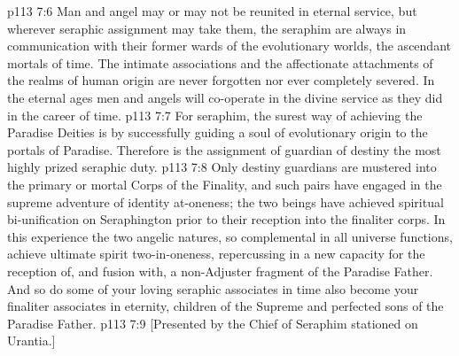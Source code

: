 \vs p113 7:6 Man and angel may or may not be reunited in eternal service, but wherever seraphic assignment may take them, the seraphim are always in communication with their former wards of the evolutionary worlds, the ascendant mortals of time. The intimate associations and the affectionate attachments of the realms of human origin are never forgotten nor ever completely severed. In the eternal ages men and angels will co\hyp{}operate in the divine service as they did in the career of time.
\pc \vs p113 7:7 For seraphim, the surest way of achieving the Paradise Deities is by successfully guiding a soul of evolutionary origin to the portals of Paradise. Therefore is the assignment of guardian of destiny the most highly prized seraphic duty.
\vs p113 7:8 Only destiny guardians are mustered into the primary or mortal Corps of the Finality, and such pairs have engaged in the supreme adventure of identity at\hyp{}oneness; the two beings have achieved spiritual bi\hyp{}unification on Seraphington prior to their reception into the finaliter corps. In this experience the two angelic natures, so complemental in all universe functions, achieve ultimate spirit two\hyp{}in\hyp{}oneness, repercussing in a new capacity for the reception of, and fusion with, a non\hyp{}Adjuster fragment of the Paradise Father. And so do some of your loving seraphic associates in time also become your finaliter associates in eternity, children of the Supreme and perfected sons of the Paradise Father.
\vsetoff
\vs p113 7:9 [Presented by the Chief of Seraphim stationed on Urantia.]
